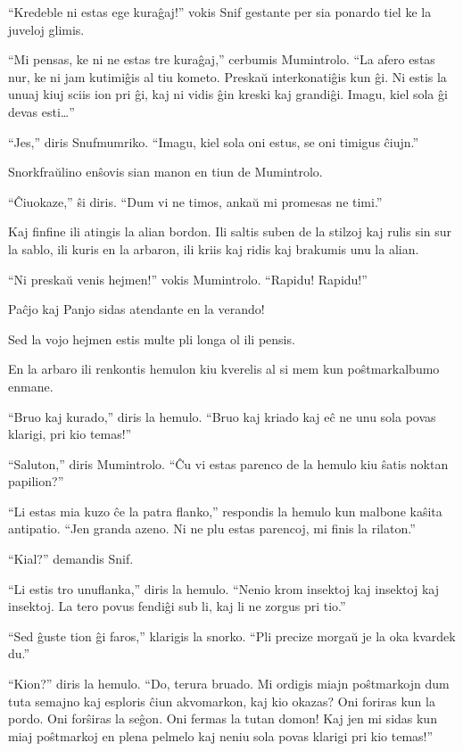 ``Kredeble ni estas ege kuraĝaj!'' vokis Snif gestante per sia ponardo tiel ke la juveloj glimis.

``Mi pensas, ke ni ne estas tre kuraĝaj,'' cerbumis Mumintrolo. ``La afero estas nur, ke ni jam kutimiĝis al tiu kometo. Preskaŭ interkonatiĝis kun ĝi. Ni estis la unuaj kiuj sciis ion pri ĝi, kaj ni vidis ĝin kreski kaj grandiĝi. Imagu, kiel sola ĝi devas esti{\ldots}''

``Jes,'' diris Snufmumriko. ``Imagu, kiel sola oni estus, se oni timigus ĉiujn.''

Snorkfraŭlino enŝovis sian manon en tiun de Mumintrolo.

``Ĉiuokaze,'' ŝi diris. ``Dum vi ne timos, ankaŭ mi promesas ne timi.''

\sectionbreak

Kaj finfine ili atingis la alian bordon. Ili saltis suben de la stilzoj kaj rulis sin sur la sablo, ili kuris en la arbaron, ili kriis kaj ridis kaj brakumis unu la alian.

``Ni preskaŭ venis hejmen!'' vokis Mumintrolo. ``Rapidu! Rapidu!''

Paĉjo kaj Panjo sidas atendante en la verando!

Sed la vojo hejmen estis multe pli longa ol ili pensis.

En la arbaro ili renkontis hemulon kiu kverelis al si mem kun poŝtmarkalbumo enmane.

``Bruo kaj kurado,'' diris la hemulo. ``Bruo kaj kriado kaj eĉ ne unu sola povas klarigi, pri kio temas!''

``Saluton,'' diris Mumintrolo. ``Ĉu vi estas parenco de la hemulo kiu ŝatis noktan papilion?''

``Li estas mia kuzo ĉe la patra flanko,'' respondis la hemulo kun malbone kaŝita antipatio. ``Jen granda azeno. Ni ne plu estas parencoj, mi finis la rilaton.''

``Kial?'' demandis Snif.

``Li estis tro unuflanka,'' diris la hemulo. ``Nenio krom insektoj kaj insektoj kaj insektoj. La tero povus fendiĝi sub li, kaj li ne zorgus pri tio.''

``Sed ĝuste tion ĝi faros,'' klarigis la snorko. ``Pli precize morgaŭ je la oka kvardek du.''

``Kion?'' diris la hemulo. ``Do, terura bruado. Mi ordigis miajn poŝtmarkojn dum tuta semajno kaj esploris ĉiun akvomarkon, kaj kio okazas? Oni foriras kun la pordo. Oni forŝiras la seĝon. Oni fermas la tutan domon! Kaj jen mi sidas kun miaj poŝtmarkoj en plena pelmelo kaj neniu sola povas klarigi pri kio temas!''

